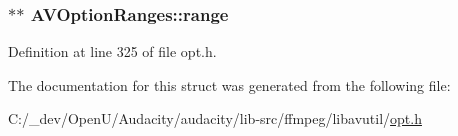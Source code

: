 \subsubsection[{\texorpdfstring{range}{range}}]{$\ast$$\ast$ A\+V\+Option\+Ranges\+::range}\hypertarget{struct_a_v_option_ranges_a6e081daa7e707607e63165909b0995ce}{}\label{struct_a_v_option_ranges_a6e081daa7e707607e63165909b0995ce}


Definition at line 325 of file opt.\+h.



The documentation for this struct was generated from the following file\+:\begin{DoxyCompactItemize}
\item 
C\+:/\+\_\+dev/\+Open\+U/\+Audacity/audacity/lib-\/src/ffmpeg/libavutil/\hyperlink{opt_8h}{opt.\+h}\end{DoxyCompactItemize}
